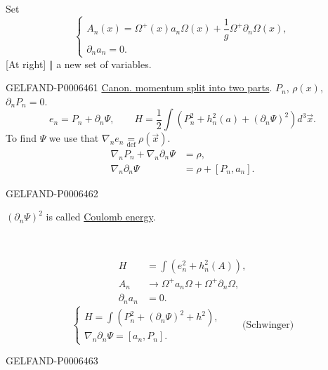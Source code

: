 Set
\[
\begin{cases}
A_n(x)=\Omega^+(x)a_n\Omega(x)+\dfrac1g\Omega^+\partial_n\Omega(x),\\
\partial_n a_n=0.
\end{cases}
\]
[At right] \(\Vert\) a new set of variables.


\begin{GelfandAdjacentEvidence}{GELFAND-P000646}{1}
\underline{Canon. momentum split into two parts}.
\(P_n\), \(\rho(x)\), \(\partial_nP_n=0\).
\[
e_n=P_n+\partial_n\Psi,\qquad
H=\frac12\int(P_n^2+h_n^2(a)+(\partial_n\Psi)^2)d^3\vec x.
\]
To find \(\Psi\) we use that \(\nabla_n e_n\underset{\mathrm{def}}{=}\rho(\vec x)\).
\[
\begin{aligned}
\nabla_nP_n+\nabla_n\partial_n\Psi&=\rho,\\
\nabla_n\partial_n\Psi&=\rho+[P_n,a_n].
\end{aligned}
\]
\end{GelfandAdjacentEvidence}
\begin{GelfandAdjacentEvidence}{GELFAND-P000646}{2}

\((\partial_n\Psi)^2\) is called \underline{Coulomb energy}.

\begin{center}\textemdash\,\textperiodcentered\,\textemdash\end{center}

\[
\begin{aligned}
H&=\int(e_n^2+h_n^2(A)),\\
A_n&\longrightarrow\Omega^+a_n\Omega+\Omega^+\partial_n\Omega,\\
\partial_n a_n&=0.
\end{aligned}
\]
\[
\begin{cases}
H=\int(P_n^2+(\partial_n\Psi)^2+h^2),\\
\nabla_n\partial_n\Psi=[a_n,P_n].
\end{cases}
\qquad\text{(Schwinger)}
\]
\end{GelfandAdjacentEvidence}
\begin{GelfandAdjacentEvidence}{GELFAND-P000646}{3}

\end{GelfandAdjacentEvidence}
